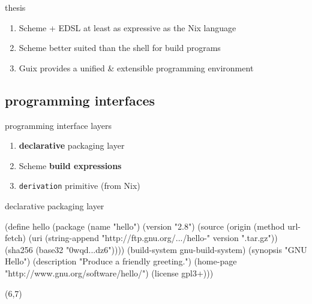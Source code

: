 \documentclass{beamer}
\begin{document}
\begin{frame}{thesis}

  \Large{
    \begin{enumerate}
    \item Scheme + EDSL at least as \alert{expressive} as the Nix
      language
    \item Scheme better suited than the shell for \alert{build
        programs}
    \item Guix provides a \alert{unified \& extensible} programming
      environment
    \end{enumerate}
  }    
\end{frame}

\subsection{programming interfaces}

\begin{frame}{programming interface layers}

  \large{
    \begin{enumerate}
    \item \alert{\textbf{declarative}} packaging layer
    \item Scheme \alert{\textbf{build expressions}}
    \item \alert{\texttt{derivation}} primitive (from Nix)
    \end{enumerate}
  }
\end{frame}

\begin{frame}[fragile]{declarative packaging layer}
  \begin{semiverbatim}
    \small{
(define hello
  (\alert{package}
   (name "hello")
   (version "2.8")
   (source (\alert{origin}
            (method url-fetch)
            (uri (string-append
                  "http://ftp.gnu.org/\textrm{...}/hello-" version
                  ".tar.gz"))
            (sha256 (base32 "0wqd\textrm{...}dz6"))))
   (\alert{build-system} gnu-build-system)
   (synopsis "GNU Hello")
   (description "Produce a friendly greeting.")
   (home-page "http://www.gnu.org/software/hello/")
   (license gpl3+)))
}
  \end{semiverbatim}

  \begin{textblock}{15}(6,7)
  \end{textblock}
\end{frame}
\end{document}
